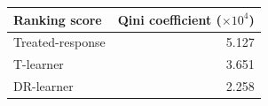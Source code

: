 \begin{tabular}{@{}lr@{}}
\toprule
Ranking score & Qini coefficient ($\times 10^{4}$) \\
\midrule
Treated-response & 5.127 \\
T-learner & 3.651 \\
DR-learner & 2.258 \\
\bottomrule
\end{tabular}
